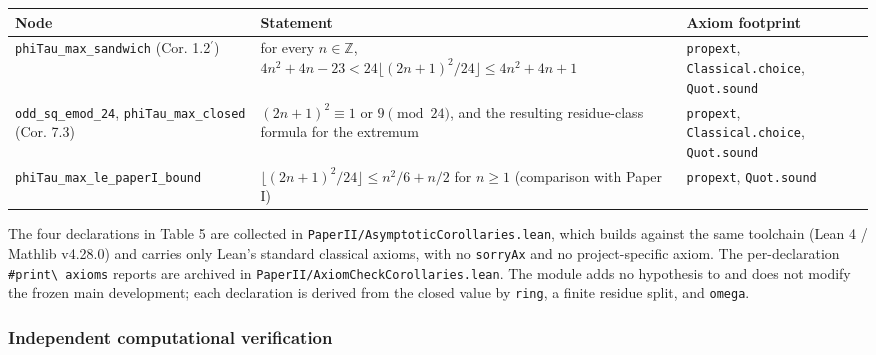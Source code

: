 \documentclass[english,11pt,a4paper]{article}
\newcounter{none}
\begin{document}
{\def\LTcaptype{none} %
\begin{longtable}[]{@{}
  >{\raggedright\arraybackslash}p{}
  >{\raggedright\arraybackslash}p{}
  >{\raggedright\arraybackslash}p{}@{}}
\toprule\noalign{}
\begin{minipage}[b]{\linewidth}\raggedright
Node
\end{minipage} & \begin{minipage}[b]{\linewidth}\raggedright
Statement
\end{minipage} & \begin{minipage}[b]{\linewidth}\raggedright
Axiom footprint
\end{minipage} \\
\midrule\noalign{}
\endhead
\bottomrule\noalign{}
\endlastfoot
\nolinkurl{phiTau_max_sandwich} (Cor. 1.2\(^{\prime}\)) & for every
\(n\in\mathbb Z\),
\(4n^2+4n-23<24\lfloor(2n+1)^2/24\rfloor\le4n^2+4n+1\) &
\nolinkurl{propext}, \nolinkurl{Classical.choice}, \nolinkurl{Quot.sound} \\
\nolinkurl{odd_sq_emod_24}, \nolinkurl{phiTau_max_closed} (Cor. 7.3) &
\((2n+1)^2\equiv1\) or \(9\pmod{24}\), and the resulting residue-class
formula for the extremum & \nolinkurl{propext}, \nolinkurl{Classical.choice},
\nolinkurl{Quot.sound} \\
\nolinkurl{phiTau_max_le_paperI_bound} &
\(\lfloor(2n+1)^2/24\rfloor\le n^2/6+n/2\) for \(n\ge1\) (comparison
with Paper I) & \nolinkurl{propext}, \nolinkurl{Quot.sound} \\
\end{longtable}
}

The four declarations in Table 5 are collected in
\nolinkurl{PaperII/AsymptoticCorollaries.lean}, which builds against the
same toolchain (Lean 4 / Mathlib v4.28.0) and carries only Lean's
standard classical axioms, with no \nolinkurl{sorryAx} and no
project-specific axiom. The per-declaration \nolinkurl{#print\ axioms}
reports are archived in \nolinkurl{PaperII/AxiomCheckCorollaries.lean}. The
module adds no hypothesis to and does not modify the frozen main
development; each declaration is derived from the closed value by
\nolinkurl{ring}, a finite residue split, and \nolinkurl{omega}.

\subsubsection{Independent computational
verification}\label{independent-computational-verification}
\end{document}
